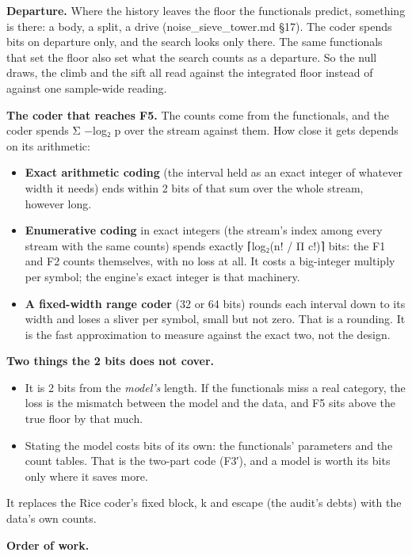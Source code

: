 \textbf{Departure.} Where the history leaves the floor the functionals predict, something is there: a body, a split, a drive (noise\_\allowbreak{}sieve\_\allowbreak{}tower.md §17). The coder spends bits on departure only, and the search looks only there. The same functionals that set the floor also set what the search counts as a departure. So the null draws, the climb and the sift all read against the integrated floor instead of against one sample-wide reading.

\textbf{The coder that reaches F5.} The counts come from the functionals, and the coder spends Σ −log₂ p over the stream against them. How close it gets depends on its arithmetic:

\begin{itemize}
\item \textbf{Exact arithmetic coding} (the interval held as an exact integer of whatever width it needs) ends within 2 bits of that sum over the whole stream, however long.
\item \textbf{Enumerative coding} in exact integers (the stream's index among every stream with the same counts) spends exactly ⌈log₂(n! / Π c!)⌉ bits: the F1 and F2 counts themselves, with no loss at all. It costs a big-integer multiply per symbol; the engine's exact integer is that machinery.
\item \textbf{A fixed-width range coder} (32 or 64 bits) rounds each interval down to its width and loses a sliver per symbol, small but not zero. That is a rounding. It is the fast approximation to measure against the exact two, not the design.
\end{itemize}

\textbf{Two things the 2 bits does not cover.}

\begin{itemize}
\item It is 2 bits from the \emph{model's} length. If the functionals miss a real category, the loss is the mismatch between the model and the data, and F5 sits above the true floor by that much.
\item Stating the model costs bits of its own: the functionals' parameters and the count tables. That is the two-part code (F3′), and a model is worth its bits only where it saves more.
\end{itemize}

It replaces the Rice coder's fixed block, k and escape (the audit's debts) with the data's own counts.

\textbf{Order of work.}

